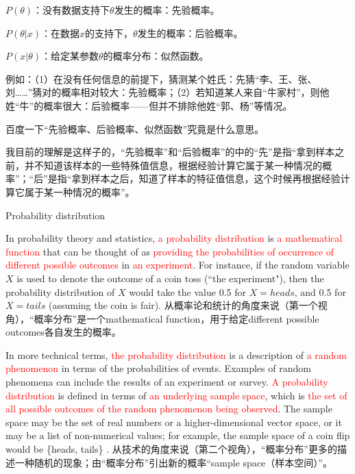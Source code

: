\documentclass[UTF8]{ctexart}
\begin{document}
$P(\theta)$：没有数据支持下$\theta$发生的概率：先验概率。

$P(\theta|x)$：在数据$x$的支持下，$\theta$发生的概率：后验概率。

$P(x|\theta)$：给定某参数$\theta$的概率分布：似然函数。

例如：（1）在没有任何信息的前提下，猜测某个姓氏：先猜“李、王、张、刘……”猜对的概率相对较大：先验概率；（2）若知道某人来自“牛家村”，则他姓“牛”的概率很大：后验概率——但并不排除他姓“郭、杨”等情况。

百度一下“先验概率、后验概率、似然函数”究竟是什么意思。

我目前的理解是这样子的，“先验概率”和“后验概率”的中的“先”是指“拿到样本之前，并不知道该样本的一些特殊值信息，根据经验计算它属于某一种情况的概率”；“后”是指“拿到样本之后，知道了样本的特征值信息，这个时候再根据经验计算它属于某一种情况的概率”。

Probability distribution


In probability theory and statistics, \textcolor{red}{a probability distribution} is \textcolor{red}{a mathematical function} that can be thought of as \textcolor{red}{providing the probabilities of occurrence of different possible outcomes} in \textcolor{red}{an experiment}. For instance, if the random variable $X$ is used to denote the outcome of a coin toss (``the experiment"), then the probability distribution of $X$ would take the value 0.5 for $X = heads$, and 0.5 for $X = tails$ (assuming the coin is fair). 从概率论和统计的角度来说（第一个视角），“概率分布”是一个mathematical function，用于给定different possible outcomes各自发生的概率。

In more technical terms, \textcolor{red}{the probability distribution} is a description of \textcolor{red}{a random phenomenon} in terms of the probabilities of events. Examples of random phenomena can include the results of an experiment or survey. \textcolor{red}{A probability distribution} is defined in terms of \textcolor{red}{an underlying sample space}, which is \textcolor{red}{the set of all possible outcomes of the random phenomenon being observed}. The sample space may be the set of real numbers or a higher-dimensional vector space, or it may be a list of non-numerical values; for example, the sample space of a coin flip would be \{heads, tails\} . 从技术的角度来说（第二个视角），“概率分布”更多的描述一种随机的现象；由“概率分布”引出新的概率“sample space（样本空间）”。
\end{document}
